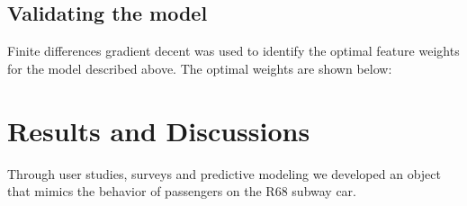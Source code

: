 \documentclass{acm_proc_article-sp}
\begin{document}
\subsection{Validating the model}
  Finite differences gradient decent\cite{flaxman2005online} was used to identify the optimal feature weights for the model described above. The optimal weights are shown below:
  

\section{Results and Discussions}
Through user studies, surveys and predictive modeling we developed an object that mimics the behavior of passengers on the R68 subway car.




\end{document}
